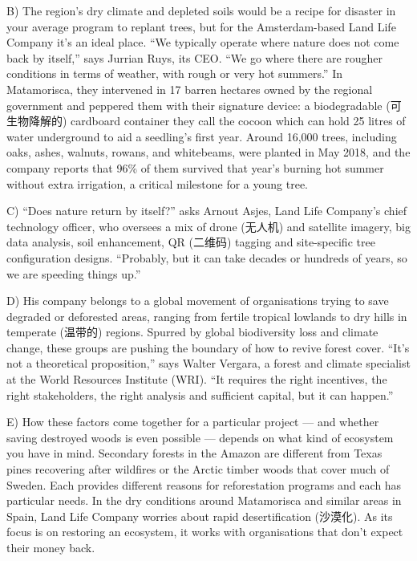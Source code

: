 \documentclass[UTF8,11pt]{ctexart}
\begin{document}
B) The region’s dry climate and depleted soils would be a recipe for disaster in your average program to replant trees, but for the Amsterdam-based Land Life Company it’s an ideal place. “We typically operate where nature does not come back by itself,” says Jurrian Ruys, its CEO. “We go where there are rougher conditions in terms of weather, with rough or very hot summers.” In Matamorisca, they intervened in 17 barren hectares owned by the regional government and peppered them with their signature device: a biodegradable (可生物降解的) cardboard container they call the cocoon which can hold 25 litres of water underground to aid a seedling’s first year. Around 16,000 trees, including oaks, ashes, walnuts, rowans, and whitebeams, were planted in May 2018, and the company reports that 96\% of them survived that year’s burning hot summer without extra irrigation, a critical milestone for a young tree.


C) “Does nature return by itself?” asks Arnout Asjes, Land Life Company’s chief technology officer, who oversees a mix of drone (无人机) and satellite imagery, big data analysis, soil enhancement, QR (二维码) tagging and site-specific tree configuration designs. “Probably, but it can take decades or hundreds of years, so we are speeding things up.”


D) His company belongs to a global movement of organisations trying to save degraded or deforested areas, ranging from fertile tropical lowlands to dry hills in temperate (温带的) regions. Spurred by global biodiversity loss and climate change, these groups are pushing the boundary of how to revive forest cover. “It’s not a theoretical proposition,” says Walter Vergara, a forest and climate specialist at the World Resources Institute (WRI). “It requires the right incentives, the right stakeholders, the right analysis and sufficient capital, but it can happen.”


E) How these factors come together for a particular project — and whether saving destroyed woods is even possible — depends on what kind of ecosystem you have in mind. Secondary forests in the Amazon are different from Texas pines recovering after wildfires or the Arctic timber woods that cover much of Sweden. Each provides different reasons for reforestation programs and each has particular needs. In the dry conditions around Matamorisca and similar areas in Spain, Land Life Company worries about rapid desertification (沙漠化). As its focus is on restoring an ecosystem, it works with organisations that don’t expect their money back.
\end{document}
